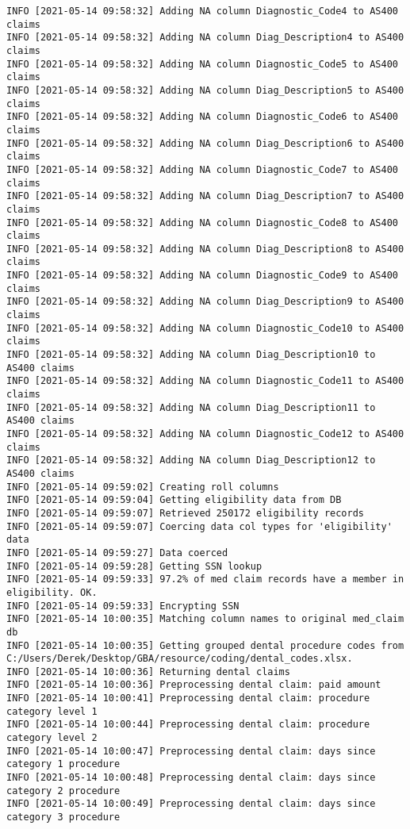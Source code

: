 \documentclass[
]{book}
\begin{document}
\begin{verbatim}
INFO [2021-05-14 09:58:32] Adding NA column Diagnostic_Code4 to AS400 claims
INFO [2021-05-14 09:58:32] Adding NA column Diag_Description4 to AS400 claims
INFO [2021-05-14 09:58:32] Adding NA column Diagnostic_Code5 to AS400 claims
INFO [2021-05-14 09:58:32] Adding NA column Diag_Description5 to AS400 claims
INFO [2021-05-14 09:58:32] Adding NA column Diagnostic_Code6 to AS400 claims
INFO [2021-05-14 09:58:32] Adding NA column Diag_Description6 to AS400 claims
INFO [2021-05-14 09:58:32] Adding NA column Diagnostic_Code7 to AS400 claims
INFO [2021-05-14 09:58:32] Adding NA column Diag_Description7 to AS400 claims
INFO [2021-05-14 09:58:32] Adding NA column Diagnostic_Code8 to AS400 claims
INFO [2021-05-14 09:58:32] Adding NA column Diag_Description8 to AS400 claims
INFO [2021-05-14 09:58:32] Adding NA column Diagnostic_Code9 to AS400 claims
INFO [2021-05-14 09:58:32] Adding NA column Diag_Description9 to AS400 claims
INFO [2021-05-14 09:58:32] Adding NA column Diagnostic_Code10 to AS400 claims
INFO [2021-05-14 09:58:32] Adding NA column Diag_Description10 to AS400 claims
INFO [2021-05-14 09:58:32] Adding NA column Diagnostic_Code11 to AS400 claims
INFO [2021-05-14 09:58:32] Adding NA column Diag_Description11 to AS400 claims
INFO [2021-05-14 09:58:32] Adding NA column Diagnostic_Code12 to AS400 claims
INFO [2021-05-14 09:58:32] Adding NA column Diag_Description12 to AS400 claims
INFO [2021-05-14 09:59:02] Creating roll columns
INFO [2021-05-14 09:59:04] Getting eligibility data from DB
INFO [2021-05-14 09:59:07] Retrieved 250172 eligibility records
INFO [2021-05-14 09:59:07] Coercing data col types for 'eligibility' data
INFO [2021-05-14 09:59:27] Data coerced
INFO [2021-05-14 09:59:28] Getting SSN lookup
INFO [2021-05-14 09:59:33] 97.2% of med claim records have a member in eligibility. OK.
INFO [2021-05-14 09:59:33] Encrypting SSN
INFO [2021-05-14 10:00:35] Matching column names to original med_claim db
INFO [2021-05-14 10:00:35] Getting grouped dental procedure codes from C:/Users/Derek/Desktop/GBA/resource/coding/dental_codes.xlsx.
INFO [2021-05-14 10:00:36] Returning dental claims
INFO [2021-05-14 10:00:36] Preprocessing dental claim: paid amount
INFO [2021-05-14 10:00:41] Preprocessing dental claim: procedure category level 1
INFO [2021-05-14 10:00:44] Preprocessing dental claim: procedure category level 2
INFO [2021-05-14 10:00:47] Preprocessing dental claim: days since category 1 procedure
INFO [2021-05-14 10:00:48] Preprocessing dental claim: days since category 2 procedure
INFO [2021-05-14 10:00:49] Preprocessing dental claim: days since category 3 procedure

\end{verbatim}
\end{document}
